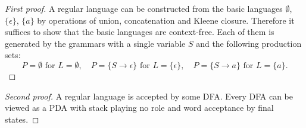 

\setcounter{section}{7}
\setcounter{subsection}{1}
\setcounter{dfn}{2}

\begin{proof}[First proof]
A regular language can be constructed from the basic languages $\emptyset$, $\{\epsilon\}$, $\{a\}$
by operations of union, concatenation and Kleene closure.
Therefore it suffices to show that the basic languages are context-free.
Each of them is generated by the grammars with a single variable $S$ and the following production sets:
\[
P = \emptyset \text{ for }L = \emptyset, \quad P = \{S \to \epsilon\} \text{ for }L = \{\epsilon\}, \quad P = \{S \to a\} \text{ for }L = \{a\}.
\]
\end{proof}

\begin{proof}[Second proof]
A regular language is accepted by some DFA. 
Every DFA can be viewed as a PDA with stack playing no role and word acceptance by final states.
\end{proof}




